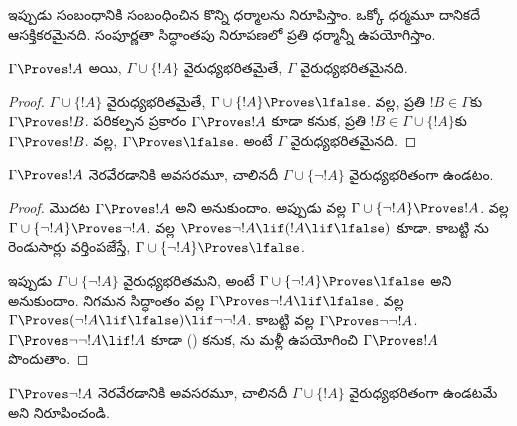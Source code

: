 \documentclass[../../../include/open-logic-section]{subfiles}
\begin{document}
      {}
      {}


ఇప్పుడు  సంబంధానికి సంబంధించిన కొన్ని ధర్మాలను నిరూపిస్తాం. ఒక్కో ధర్మమూ దానికదే ఆసక్తికరమైనది.
సంపూర్ణతా సిద్ధాంతపు నిరూపణలో ప్రతి ధర్మాన్నీ ఉపయోగిస్తాం.

\begin{prop}
  $\Gamma \Proves !A$ అయి, $\Gamma \cup \{!A\}$ వైరుధ్యభరితమైతే,
  $\Gamma$ వైరుధ్యభరితమైనది.
\end{prop}

\begin{proof}
  $\Gamma \cup \{!A\}$ వైరుధ్యభరితమైతే, $\Gamma \cup \{!A\}
  \Proves \lfalse$.  వల్ల, ప్రతి
  $!B \in \Gamma$కు $\Gamma \Proves !B$. పరికల్పన ప్రకారం
  $\Gamma \Proves !A$ కూడా కనుక, ప్రతి $!B \in \Gamma \cup
  \{!A\}$కు $\Gamma \Proves !B$. 
  వల్ల, $\Gamma \Proves \lfalse$. అంటే $\Gamma$ వైరుధ్యభరితమైనది.
\end{proof}

\begin{prop}
$\Gamma \Proves !A$ నెరవేరడానికి అవసరమూ, చాలినదీ $\Gamma \cup
\{\lnot !A\}$ వైరుధ్యభరితంగా ఉండటం.
\end{prop}

\begin{proof}
మొదట $\Gamma \Proves !A$ అని అనుకుందాం. అప్పుడు
 వల్ల $\Gamma \cup \{\lnot !A\}
\Proves !A$.  వల్ల $\Gamma \cup
\{\lnot !A\} \Proves \lnot !A$.  వల్ల
$\Proves \lnot !A \lif (!A \lif \lfalse)$ కూడా. కాబట్టి
ను రెండుసార్లు వర్తింపజేస్తే, $\Gamma \cup
\{\lnot !A\} \Proves \lfalse$.

ఇప్పుడు $\Gamma \cup \{\lnot !A\}$ వైరుధ్యభరితమని, అంటే $\Gamma \cup
\{\lnot !A\} \Proves \lfalse$ అని అనుకుందాం. నిగమన సిద్ధాంతం వల్ల
$\Gamma \Proves \lnot !A \lif \lfalse$. 
వల్ల $\Gamma \Proves (\lnot !A \lif \lfalse) \lif \lnot\lnot !A$.
కాబట్టి  వల్ల $\Gamma \Proves \lnot\lnot !A$.
$\Gamma \Proves \lnot\lnot !A \lif !A$ కూడా
() కనుక, ను మళ్లీ ఉపయోగించి
$\Gamma \Proves !A$ పొందుతాం.
\end{proof}

\begin{prob}
$\Gamma \Proves \lnot !A$ నెరవేరడానికి అవసరమూ, చాలినదీ $\Gamma \cup
\{!A\}$ వైరుధ్యభరితంగా ఉండటమే అని నిరూపించండి.
\end{prob}
\end{document}
